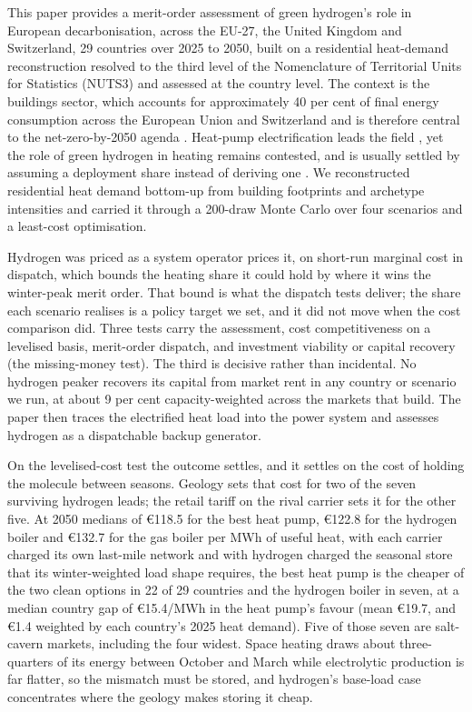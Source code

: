This paper provides a merit-order assessment of green hydrogen's role in European
decarbonisation, across the EU-27, the United Kingdom and Switzerland, 29 countries over
2025 to 2050, built on a residential heat-demand reconstruction resolved to the third
level of the Nomenclature of Territorial Units for Statistics (NUTS3) and assessed at
the country level. The context is the buildings sector, which accounts for approximately
40 per cent of final energy consumption across the European Union and Switzerland and is
therefore central to the net-zero-by-2050 agenda
\citep{IEA2022buildings,EuropeanCommission2020GreenDeal}. Heat-pump electrification
leads the field \citep{IEA2022heatpumps,Abbasi2021}, yet the role of green hydrogen in
heating remains contested, and is usually settled by assuming a deployment share instead
of deriving one \citep{Rosenow2022PipeDream,Cebon2022}. We reconstructed residential
heat demand bottom-up from building footprints and archetype intensities and carried it
through a 200-draw Monte Carlo over four scenarios and a least-cost optimisation.

Hydrogen was priced as a system operator prices it, on short-run marginal cost in
dispatch, which bounds the heating share it could hold by where it wins the winter-peak
merit order. That bound is what the dispatch tests deliver; the share each scenario
realises is a policy target we set, and it did not move when the cost comparison did.
Three tests carry the assessment, cost competitiveness on a levelised basis, merit-order
dispatch, and investment viability or capital recovery (the missing-money test). The third
is decisive rather than incidental. No hydrogen peaker recovers its capital from market
rent in any country or scenario we run, at about 9 per cent capacity-weighted across the
markets that build. The paper then traces the electrified heat load into the power system and assesses
hydrogen as a dispatchable backup generator.

On the levelised-cost test the outcome settles, and it settles on the cost of holding
the molecule between seasons. Geology sets that cost for two of the seven surviving
hydrogen leads; the retail tariff on the rival carrier sets it for the other five. At 2050
medians of \euro{}118.5 for the best heat pump, \euro{}122.8 for the hydrogen boiler and
\euro{}132.7 for the gas boiler per MWh of useful heat, with each carrier charged its
own last-mile network and with hydrogen charged the seasonal store that its
winter-weighted load shape requires, the best heat pump is the cheaper of the two clean
options in 22 of 29 countries and the hydrogen boiler in seven, at a median country gap
of \euro{}15.4/MWh in the heat pump's favour (mean \euro{}19.7, and \euro{}1.4 weighted by each country's 2025 heat demand). Five of those seven are salt-cavern markets, including the four widest.
Space heating draws about three-quarters of its energy between October and March while
electrolytic production is far flatter, so the mismatch must be stored, and hydrogen's
base-load case concentrates where the geology makes storing it cheap.

